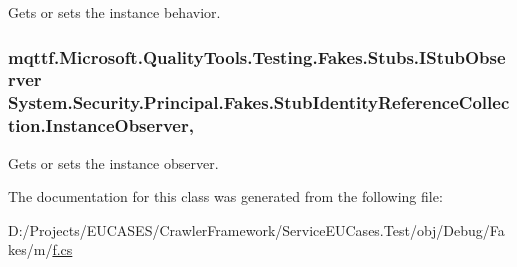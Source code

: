 Gets or sets the instance behavior.

\hypertarget{class_system_1_1_security_1_1_principal_1_1_fakes_1_1_stub_identity_reference_collection_ae6c621aad2eaa3127802c40044a08f52}{
\subsubsection[{Instance\-Observer}]{\setlength{\rightskip}{0pt plus 5cm}mqttf.\-Microsoft.\-Quality\-Tools.\-Testing.\-Fakes.\-Stubs.\-I\-Stub\-Observer System.\-Security.\-Principal.\-Fakes.\-Stub\-Identity\-Reference\-Collection.\-Instance\-Observer\hspace{0.3cm}{\ttfamily [get]}, {\ttfamily [set]}}}\label{class_system_1_1_security_1_1_principal_1_1_fakes_1_1_stub_identity_reference_collection_ae6c621aad2eaa3127802c40044a08f52}


Gets or sets the instance observer.



The documentation for this class was generated from the following file\-:\begin{DoxyCompactItemize}
\item 
D\-:/\-Projects/\-E\-U\-C\-A\-S\-E\-S/\-Crawler\-Framework/\-Service\-E\-U\-Cases.\-Test/obj/\-Debug/\-Fakes/m/\hyperlink{m_2f_8cs}{f.\-cs}\end{DoxyCompactItemize}
